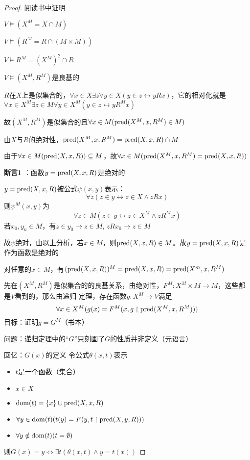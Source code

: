 \documentclass[11pt]{article}
\begin{document}
\begin{proof}
阅读书中证明

\(V\vDash(X^M=X\cap M)\)

\(V\vDash(R^M=R\cap(M\times M))\)

\(V\vDash R^M=(X^M)^2\cap R\)

\(V\vDash(X^M,R^M)\)是良基的


\(R\)在\(X\)上是似集合的，\(\forall x\in X\exists z\forall y\in X(y\in z\leftrightarrow yRx)\)，它的相对化就是
\(\forall x\in X^M\exists z\in M\forall y\in X^M(y\in z\leftrightarrow yR^Mx)\)

故\((X^M,R^M)\)是似集合的且\(\forall x\in M(\text{pred}(X^M,x,R^M)\in M)\)

由\(X\)与\(R\)的绝对性，\(\text{pred}(X^M,x,R^M)=\text{pred}(X,x,R)\cap M\)

由于\(\forall x\in M(\text{pred}(X,x,R))\subseteq M\)，故\(\forall x\in M(\text{pred}(X^M,x,R^M)=\text{pred}(X,x,R))\)

\textbf{断言1} ：函数\(y=\text{pred}(X,x,R)\)是绝对的

\(y=\text{pred}(X,x,R)\)被公式\(\psi(x,y)\)表示：
\begin{equation*}
\forall z(z\in y\leftrightarrow z\in X\wedge zRx)
\end{equation*}
则\(\psi^M(x,y)\)为
\begin{equation*}
\forall z\in M(z\in y\leftrightarrow z\in X^M\wedge zR^Mx)
\end{equation*}
若\(x_0,y_n\in M\)，有\(z\in y_0\to z\in M\), \(zRx_0\to z\in M\)

故\(\psi\)绝对，由以上分析，若\(x\in M\)，则\(\text{pred}(X,x,R)\in M\)。故\(y=\text{pred}(X,x,R)\)是作为函数是绝对的

对任意的\(x\in M\)，有\((\text{pred}(X,x,R))^M=\text{pred}(X,x,R)=\text{pred}(X^m,x,R^M)\)

先在\((X^M,R^M)\)是似集合的的良基关系，由绝对性，\(F^M:X^M\times M\to M\)，这些都是\(V\)看到的，那么由递归
定理，存在函数\(g:X^M\to V\)满足
\begin{equation*}
\forall x\in X^M(g(x)=F^M(x,g\upharpoonright\text{pred}(X^M,x,R^M)))
\end{equation*}
目标：证明\(g=G^M\)（书本）

问题：递归定理中的``\(G\)''只刻画了\(G\)的性质并非定义（元语言）

回亿：\(G(x)\)的定义
令公式\(\theta(x,t)\)表示
\begin{itemize}
\item \(t\)是一个函数（集合）
\item \(x\in X\)
\item \(\operatorname{dom}(t)=\{x\}\cup\text{pred}(X,x,R)\)
\item \(\forall y\in\operatorname{dom}(t)(t(y)=F(y,t\upharpoonright\text{pred}(X,y,R)))\)
\item \(\forall y\notin\operatorname{dom}(t)(t=\emptyset)\)
\end{itemize}
则\(G(x)=y\Leftrightarrow \exists t(\theta(x,t)\wedge y=t(x))\)


\end{proof}
\end{document}
